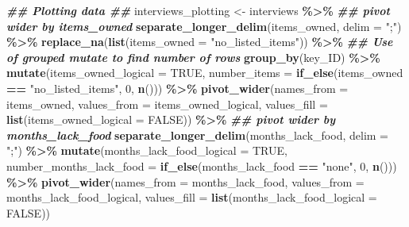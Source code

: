 \documentclass[
]{article}
\newenvironment{Shaded}{\begin{snugshade}}{\end{snugshade}}
\newcommand{\AttributeTok}[1]{\textcolor[rgb]{0.13,0.29,0.53}{#1}}
\newcommand{\ConstantTok}[1]{\textcolor[rgb]{0.56,0.35,0.01}{#1}}
\newcommand{\DecValTok}[1]{\textcolor[rgb]{0.00,0.00,0.81}{#1}}
\newcommand{\DocumentationTok}[1]{\textcolor[rgb]{0.56,0.35,0.01}{\textbf{\textit{#1}}}}
\newcommand{\FunctionTok}[1]{\textcolor[rgb]{0.13,0.29,0.53}{\textbf{#1}}}
\newcommand{\NormalTok}[1]{#1}
\newcommand{\OtherTok}[1]{\textcolor[rgb]{0.56,0.35,0.01}{#1}}
\newcommand{\SpecialCharTok}[1]{\textcolor[rgb]{0.81,0.36,0.00}{\textbf{#1}}}
\newcommand{\StringTok}[1]{\textcolor[rgb]{0.31,0.60,0.02}{#1}}
\begin{document}
\begin{Shaded}
\begin{Highlighting}[]
\DocumentationTok{\#\# Plotting data \#\#}
\NormalTok{interviews\_plotting }\OtherTok{\textless{}{-}}\NormalTok{ interviews }\SpecialCharTok{\%\textgreater{}\%}
  \DocumentationTok{\#\# pivot wider by items\_owned}
  \FunctionTok{separate\_longer\_delim}\NormalTok{(items\_owned, }\AttributeTok{delim =} \StringTok{";"}\NormalTok{) }\SpecialCharTok{\%\textgreater{}\%}
  \FunctionTok{replace\_na}\NormalTok{(}\FunctionTok{list}\NormalTok{(}\AttributeTok{items\_owned =} \StringTok{"no\_listed\_items"}\NormalTok{)) }\SpecialCharTok{\%\textgreater{}\%}
  \DocumentationTok{\#\# Use of grouped mutate to find number of rows}
  \FunctionTok{group\_by}\NormalTok{(key\_ID) }\SpecialCharTok{\%\textgreater{}\%} 
  \FunctionTok{mutate}\NormalTok{(}\AttributeTok{items\_owned\_logical =} \ConstantTok{TRUE}\NormalTok{,}
         \AttributeTok{number\_items =} \FunctionTok{if\_else}\NormalTok{(items\_owned }\SpecialCharTok{==} \StringTok{"no\_listed\_items"}\NormalTok{, }\DecValTok{0}\NormalTok{, }\FunctionTok{n}\NormalTok{())) }\SpecialCharTok{\%\textgreater{}\%} 
  \FunctionTok{pivot\_wider}\NormalTok{(}\AttributeTok{names\_from =}\NormalTok{ items\_owned,}
              \AttributeTok{values\_from =}\NormalTok{ items\_owned\_logical,}
              \AttributeTok{values\_fill =} \FunctionTok{list}\NormalTok{(}\AttributeTok{items\_owned\_logical =} \ConstantTok{FALSE}\NormalTok{)) }\SpecialCharTok{\%\textgreater{}\%} 
  \DocumentationTok{\#\# pivot wider by months\_lack\_food}
  \FunctionTok{separate\_longer\_delim}\NormalTok{(months\_lack\_food, }\AttributeTok{delim =} \StringTok{";"}\NormalTok{) }\SpecialCharTok{\%\textgreater{}\%}
  \FunctionTok{mutate}\NormalTok{(}\AttributeTok{months\_lack\_food\_logical =} \ConstantTok{TRUE}\NormalTok{,}
         \AttributeTok{number\_months\_lack\_food =} \FunctionTok{if\_else}\NormalTok{(months\_lack\_food }\SpecialCharTok{==} \StringTok{"none"}\NormalTok{, }\DecValTok{0}\NormalTok{, }\FunctionTok{n}\NormalTok{())) }\SpecialCharTok{\%\textgreater{}\%}
  \FunctionTok{pivot\_wider}\NormalTok{(}\AttributeTok{names\_from =}\NormalTok{ months\_lack\_food,}
              \AttributeTok{values\_from =}\NormalTok{ months\_lack\_food\_logical,}
              \AttributeTok{values\_fill =} \FunctionTok{list}\NormalTok{(}\AttributeTok{months\_lack\_food\_logical =} \ConstantTok{FALSE}\NormalTok{))}
\end{Highlighting}
\end{Shaded}
\end{document}
